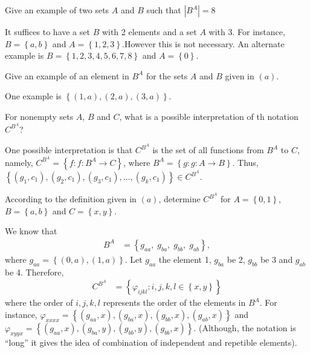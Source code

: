 \documentclass[12pt]{article}
\newenvironment{problem}[2][Problem]{\begin{trivlist} \item[\hskip \labelsep {\bfseries #1}\hskip \labelsep {\bfseries #2.}]}{\end{trivlist}}
\newenvironment{solution}[1][Solution]{\begin{trivlist} \item[\hskip \labelsep {\bfseries #1}]}{\end{trivlist}}
\begin{document}
    \begin{problem}{16}
      \begin{enumerate}[label=(\alph*)]
	\item Give an example of two sets $A$ and $B$ such that $|B^{A}|=8$
    \begin{solution}
      It suffices to have a set $B$ with 2 elements and a set $A$ with 3. For instance, $B=\left\{ a,b \right\}$ and $A=\left\{1,2,3 \right\}$.However this is not necessary. An alternate example is $B=\left\{1,2,3,4,5,6,7,8\right\}$ and $A=\left\{0\right\}$.
    \end{solution}
	\item Give an example of an element in $B^{A}$ for the sets $A$ and $B$ given in $(a)$.
    \begin{solution}
      One example is $\left\{(1,a),(2,a),(3,a)\right\}$.
    \end{solution}
    \end{enumerate}
    \end{problem}
    \begin{problem}{17}
      \begin{enumerate}[label=(\alph*)]
	\item For nonempty sets $A$, $B$ and $C$, what is a possible interpretation of th notation $C^{B^{A}}$?
    \begin{solution}
      One possible interpretation is that $C^{B^{A}}$ is the set of all functions from $B^{A}$ to $C$, namely, $C^{B^{A}}=\left\{f:f:B^{A}\to C\right\}$, where $B^{A}=\left\{g:g:A\to B \right\}$. Thus, $\left\{(g_{1},c_{1}),(g_{2},c_{1}),(g_{3},c_{1}),\dots,(g_{k},c_{1})\right\}\in C^{B^{A}}$.
    \end{solution}
	\item According to the definition given in $(a)$, determine $C^{B^{A}}$ for $A=\left\{ 0,1 \right\}$, $B=\left\{ a,b \right\}$ and $C=\left\{ x,y \right\}$. 
    \begin{solution}
        We know that
    \begin{align*}
      B^{A} &= \left\{ g_{aa}, \;g_{ba}, \;g_{bb}, \;g_{ab}\right\},
    \end{align*}
    where $g_{aa} = \left\{ (0,a),(1,a) \right\}$. Let $g_{aa}$ the element 1, $g_{ba}$ be 2, $g_{bb}$ be 3 and $g_{ab}$ be 4. Therefore,
    \begin{align*}
      C^{B^{A}} &= \left\{ \varphi_{ijkl}: i,j,k,l\in\left\{ x,y \right\}\right\}
    \end{align*}
    where the order of $i,j,k,l$ represents the order of the elements in $B^{A}$. For instance, $\varphi_{xxxx} = \left\{ (g_{aa},x), ( g_{ba},x), (g_{bb},x), (g_{ab}, x)\right\}$ and $\varphi_{xyyx} = \left\{ (g_{aa},x),(g_{ba},y), (g_{bb},y), (g_{bb},x) \right\}$. (Although, the notation is ``long'' it gives the idea of combination of independent and repetible elements).
    \end{solution}
    \end{enumerate}
    \end{problem}
   
       
\end{document}
